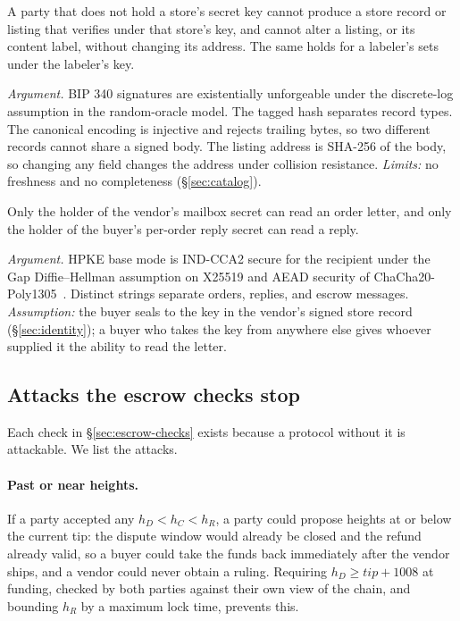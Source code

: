 \begin{property}
A party that does not hold a store's secret key cannot produce a store record or listing that verifies under that store's key, and cannot alter a listing, or its content label, without changing its address. The same holds for a labeler's sets under the labeler's key.
\end{property}
\noindent\emph{Argument.} BIP 340 signatures are existentially unforgeable under the discrete-log assumption in the random-oracle model. The tagged hash separates record types. The canonical encoding is injective and rejects trailing bytes, so two different records cannot share a signed body. The listing address is SHA-256 of the body, so changing any field changes the address under collision resistance. \emph{Limits:} no freshness and no completeness (\S\ref{sec:catalog}).

\begin{property}
Only the holder of the vendor's mailbox secret can read an order letter, and only the holder of the buyer's per-order reply secret can read a reply.
\end{property}
\noindent\emph{Argument.} HPKE base mode is IND-CCA2 secure for the recipient under the Gap Diffie--Hellman assumption on X25519 and AEAD security of ChaCha20-Poly1305~\citep{rfc9180}. Distinct  strings separate orders, replies, and escrow messages. \emph{Assumption:} the buyer seals to the key in the vendor's signed store record (\S\ref{sec:identity}); a buyer who takes the key from anywhere else gives whoever supplied it the ability to read the letter.

\subsection{Attacks the escrow checks stop}
\label{sec:attacks}

Each check in \S\ref{sec:escrow-checks} exists because a protocol without it is attackable. We list the attacks.

\paragraph{Past or near heights.} If a party accepted any $h_D<h_C<h_R$, a party could propose heights at or below the current tip: the dispute window would already be closed and the refund already valid, so a buyer could take the funds back immediately after the vendor ships, and a vendor could never obtain a ruling. Requiring $h_D \ge \mathit{tip}+1008$ at funding, checked by both parties against their own view of the chain, and bounding $h_R$ by a maximum lock time, prevents this.

